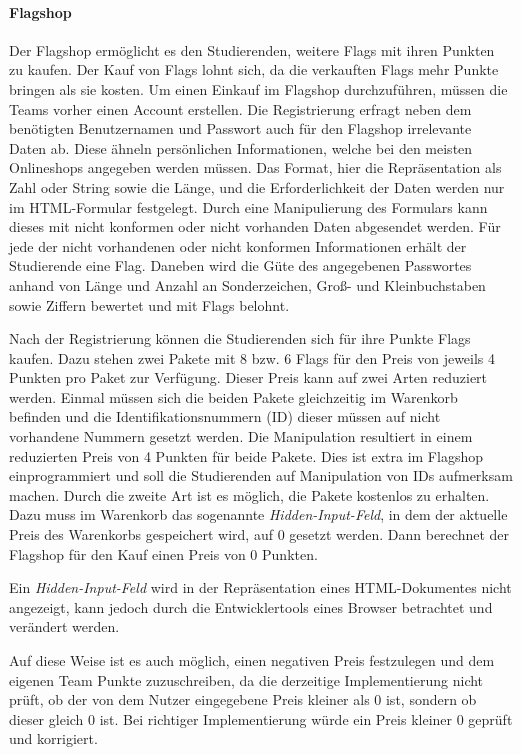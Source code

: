 \paragraph{Flagshop} \label{para:Flagshop}
Der Flagshop ermöglicht es den Studierenden, weitere Flags mit ihren Punkten zu kaufen. Der Kauf von Flags lohnt sich, da die verkauften Flags mehr Punkte bringen als sie kosten. Um einen Einkauf im Flagshop durchzuführen, müssen die Teams vorher einen Account erstellen. Die Registrierung erfragt neben dem benötigten Benutzernamen und Passwort auch für den Flagshop irrelevante Daten ab. Diese ähneln persönlichen Informationen, welche bei den meisten Onlineshops angegeben werden müssen. Das Format, hier die Repräsentation als Zahl oder String sowie die Länge, und die Erforderlichkeit der Daten werden nur im HTML-Formular festgelegt. Durch eine Manipulierung des Formulars kann dieses mit nicht konformen oder nicht vorhanden Daten abgesendet werden. Für jede der nicht vorhandenen oder nicht konformen Informationen erhält der Studierende eine Flag. Daneben wird die Güte des angegebenen Passwortes anhand von Länge und Anzahl an Sonderzeichen, Groß- und Kleinbuchstaben sowie Ziffern bewertet und mit Flags belohnt.

Nach der Registrierung können die Studierenden sich für ihre Punkte Flags kaufen. Dazu stehen zwei Pakete mit 8 bzw. 6 Flags für den Preis von jeweils 4 Punkten pro Paket zur Verfügung. Dieser Preis kann auf zwei Arten reduziert werden. 
Einmal müssen sich die beiden Pakete gleichzeitig im Warenkorb befinden und die Identifikationsnummern (ID) dieser müssen auf nicht vorhandene Nummern gesetzt werden. Die Manipulation resultiert in einem reduzierten Preis von 4 Punkten für beide Pakete. Dies ist extra im Flagshop einprogrammiert und soll die Studierenden auf Manipulation von IDs aufmerksam machen.
Durch die zweite Art ist es möglich, die Pakete kostenlos zu erhalten. Dazu muss im Warenkorb das sogenannte \textit{Hidden-Input-Feld}, in dem der aktuelle Preis des Warenkorbs gespeichert wird, auf 0 gesetzt werden. Dann berechnet der Flagshop für den Kauf einen Preis von 0 Punkten. \cite[S. 63]{abtsUeberarbeitungUndErweiterung2016}

Ein \textit{Hidden-Input-Feld} wird in der Repräsentation eines HTML-Dokumentes nicht angezeigt, kann jedoch durch die Entwicklertools eines Browser betrachtet und verändert werden. \cite{w3schoolsHTMLHiddenInput}

Auf diese Weise ist es auch möglich, einen negativen Preis festzulegen und dem eigenen Team Punkte zuzuschreiben, da die derzeitige Implementierung nicht prüft, ob der von dem Nutzer eingegebene Preis kleiner als 0 ist, sondern ob dieser gleich 0 ist. Bei richtiger Implementierung würde ein Preis kleiner 0 geprüft und korrigiert.

